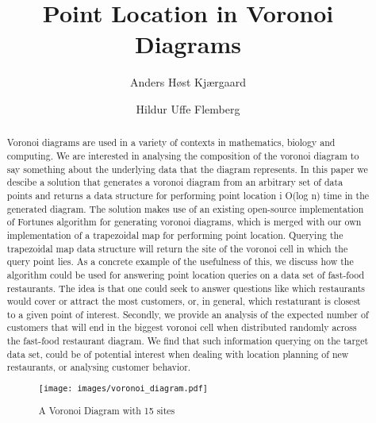 \documentclass[oribibl]{llncs}
\begin{document}

\mainmatter              %
\title{Point Location in Voronoi Diagrams}

\author{Anders Høst Kjærgaard \and Hildur Uffe Flemberg\\
}



\maketitle              %

\begin{abstract}
Voronoi diagrams are used in a variety of contexts in mathematics, biology and computing. We are interested in analysing the composition of the voronoi diagram to say something  about the underlying data that the diagram represents. In this paper we descibe a solution that generates a voronoi diagram from an arbitrary set of data points and returns a data structure for performing point location i O(log n) time in the generated diagram. The solution makes use of an existing open-source implementation of Fortunes algorithm for generating voronoi diagrams, which is merged with our own implementation of a trapezoidal map for performing point location. Querying the trapezoidal map data structure will return the site of the voronoi cell in which the query point lies. As a concrete example of the usefulness of this, we discuss how the algorithm could be used for answering point location queries on a data set of fast-food restaurants. The idea is that one could seek to answer questions like which restaurants would cover or attract the most customers, or, in general, which restaturant is closest to a given point of interest. Secondly, we provide an analysis of the expected number of customers that will end in the biggest voronoi cell when distributed randomly across the fast-food restaurant diagram. We find that such information querying on the target data set, could be of potential interest when dealing with location planning of new restaurants, or analysing customer behavior.

\begin{figure}[t]
    \centering
      \texttt{[image: images/voronoi\_diagram.pdf]}
    \caption{A Voronoi Diagram with 15 sites}
    \label{fig:Pipes2IFCWorkflow}
\end{figure}


\end{abstract}











\end{document}
